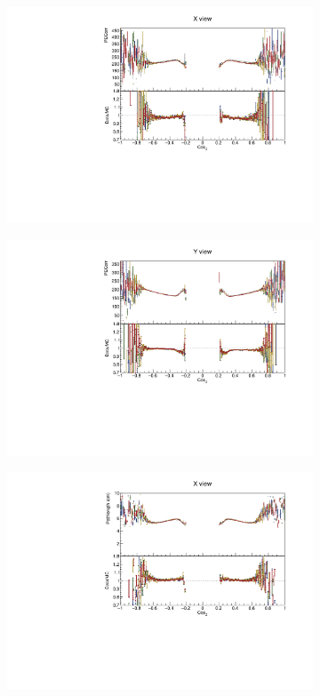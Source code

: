 \begin{figure}[!ht]
\begin{subfigure}{0.495\textwidth}
  \end{subfigure}
  \begin{subfigure}{0.495\textwidth}
    \includegraphics[width=\linewidth]{PlotsAngularDistribution/pecorr_cosz_x.pdf}
  \end{subfigure}
  \begin{subfigure}{0.495\textwidth}
    \includegraphics[width=\linewidth]{PlotsAngularDistribution/pecorr_cosz_y.pdf}
  \end{subfigure}
  \begin{subfigure}{0.495\textwidth}
    \includegraphics[width=\linewidth]{PlotsAngularDistribution/cm_cosz_x.pdf}

\end{subfigure}
\end{figure}
